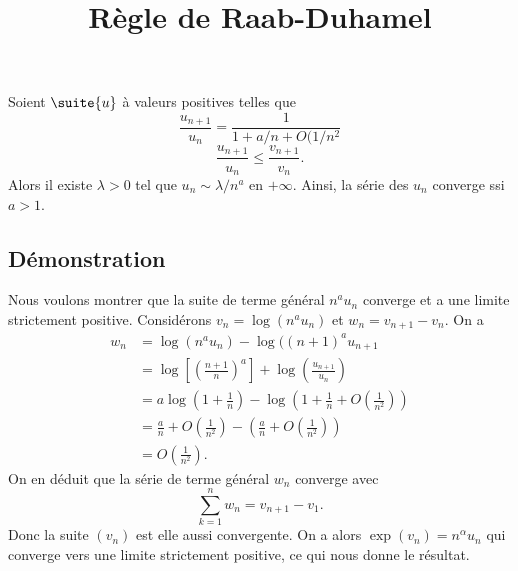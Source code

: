 \documentclass[fontsize=12pt,twoside=false,parskip=half, french]{scrartcl}
\title{Règle de Raab-Duhamel}
\date{}
\author{}
\begin{document}
\maketitle
   \begin{Theoreme}
      Soient $\suite{u}$ à valeurs positives telles que 
      \[
         \frac{u_{n + 1}}{u_n} = \frac{1}{1 + a/n + O(1/n^2}
      \]
      \[
         \frac{u_{n + 1}}{u_n} \leq \frac{v_{n + 1}}{v_n}.
      \]
      Alors il existe $\lambda > 0$ tel que $u_n \sim \lambda / n^a$ en $+\infty$.
      Ainsi, la série des $u_n$ converge ssi $a > 1$.
   \end{Theoreme}
   \subsection{Démonstration}
      Nous voulons montrer que la suite de terme général $n^a u_n$ converge 
      et a une limite strictement positive. Considérons $v_n = \log(n^a u_n)$
      et $w_n = v_{n + 1} - v_n$. On a
      \begin{align*}
         w_n &= \log(n^a u_n) - \log((n + 1)^a u_{n + 1}\\
             &= \log \left[\left(\frac{n + 1}{n}\right)^a\right] + \log\left(\frac{u_{n + 1}}{u_n}\right)\\
             &= a \log\left(1 + \frac{1}{n}\right) - \log\left(1 + \frac{1}{n} + O\left(\frac{1}{n^2}\right)\right)\\
             &= \frac{a}{n} + O\left(\frac{1}{n^2}\right) - \left(\frac{a}{n} + O\left(\frac{1}{n^2}\right)\right)\\
             &= O\left(\frac{1}{n^2}\right).
      \end{align*}
      On en déduit que la série de terme général $w_n$ converge avec
      \[
         \sum_{k = 1}^n w_n = v_{n + 1} - v_1.
      \]
      Donc la suite $(v_n)$ est elle aussi convergente. On a alors $\exp(v_n) = n^\alpha u_n$
      qui converge vers une limite strictement positive, ce qui nous donne le résultat.
\end{document}
